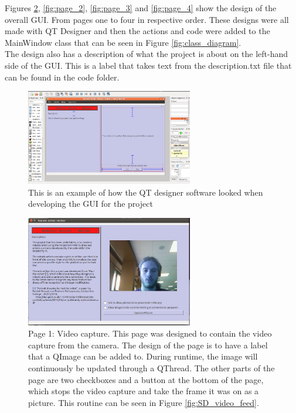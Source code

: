 \documentclass{article}
\begin{document}
Figures \ref{fig:page_1}, \ref{fig:page_2}, \ref{fig:page_3} and \ref{fig:page_4} show the design of the overall GUI. From pages one to four in respective order. These designs were all made with QT Designer and then the actions and code were added to the MainWindow class that can be seen in Figure \ref{fig:class_diagram}.
\\ \newline
The design also has a description of what the project is about on the left-hand side of the GUI. This is a label that takes text from the description.txt file that can be found in the code folder. \\ \newline
\begin{figure}[h]
    \centering
    \includegraphics[width=0.65\textwidth]{qt_designer.png}
    \caption{This is an example of how the QT designer software looked when developing the GUI for the project}
    \label{fig:Qt_designer}
\end{figure}

\begin{figure}[h]
    \centering
    \includegraphics[width=0.65\textwidth]{page1.png}
    \caption{Page 1: Video capture. This page was designed to contain the video capture from the camera. The design of the page is to have a label that a QImage can be added to. During runtime, the image will continuously be updated through a QThread. The other parts of the page are two checkboxes and a button at the bottom of the page, which stops the video capture and take the frame it was on as a picture. This routine can be seen in Figure \ref{fig:SD_video_feed}.}
    \label{fig:page_1}
\end{figure}
\end{document}
